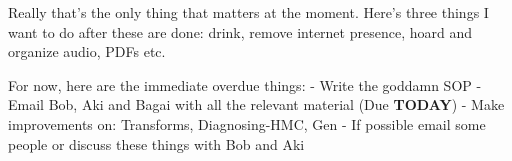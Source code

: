 \noindent {}

Really that's the only thing that matters at the moment. Here's three things I want to do after these are done: drink, remove internet presence, hoard and organize audio, PDFs etc.

For now, here are the immediate overdue things:
- Write the goddamn SOP
- Email Bob, Aki and Bagai with all the relevant material (Due \textbf{TODAY})
- Make improvements on: Transforms, Diagnosing-HMC, Gen
- If possible email some people or discuss these things with Bob and Aki